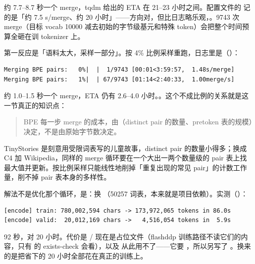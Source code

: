 约 7.7--8.7 秒一个 merge，tqdm 给出的 ETA 在 21--23 小时之间。配置文件的  记的是「约 7.5 s/merge、约 20 小时」——方向对，但比日志略乐观，。9743 次 merge（目标 vocab 10000 减去初始的字节级基元和特殊 token）会把整个时间预算全砸在训 tokenizer 上。

第一反应是「语料太大，采样一部分」。按 4\% 比例采样重跑，日志里是（）：

\begin{lstlisting}[style=hlrepl]
Merging BPE pairs:   0%|  |  1/9743 [00:01<3:59:57,  1.48s/merge]
Merging BPE pairs:   1%|  | 67/9743 [01:14<2:40:33,  1.00merge/s]
\end{lstlisting}

约 1.0--1.5 秒一个 merge，ETA 仍有 2.6--4.0 小时。。这个不成比例的关系就是这一节真正的知识点：

\begin{quote}
BPE 每一步 merge 的成本，由（distinct pair 的数量、pretoken 表的规模）决定，不是由原始字节数决定。
\end{quote}

TinyStories 是刻意用受限词表写的儿童故事，distinct pair 的数量小得多；换成 C4 加 Wikipedia，同样的 merge 循环要在一个大出一两个数量级的 pair 表上找最大值并更新。按比例采样只能线性地削掉「重复出现的常见 pair」的计数工作量，削不掉 pair 表本身的多样性。

解法不是优化那个循环，是：换 （50257 词表，本来就是项目依赖）。实测（）：

\begin{lstlisting}[style=hlrepl]
[encode] train: 780,002,594 chars -> 173,972,065 tokens in 86.0s
[encode] valid:  20,012,169 chars ->   4,516,054 tokens in  5.9s
\end{lstlisting}

92 秒，对 20 小时。代价是  /  现在是占位文件（flashddp 训练路径不读它们的内容，只有  的 exists-check 会看），以及  从此用不了——它要 ，所以另写了 。换来的是把省下的 20 小时全部花在真正的训练上。

